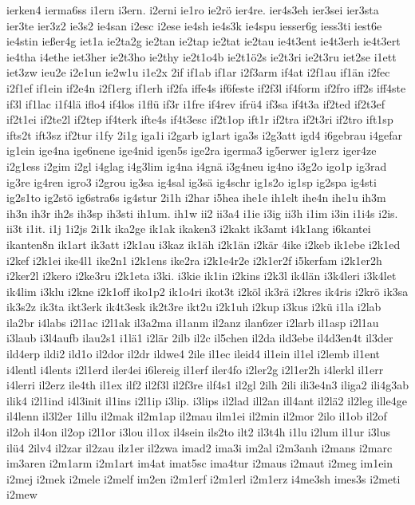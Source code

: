 {ierken4
ierma6ss
i1ern
i3ern.
i2erni
ie1ro
ie2rö
ier4re.
ier4s3eh
ier3sei
ier3sta
ier3te
ier3z2
ie3s2
ie4san
i2esc
i2ese
ie4sh
ie4s3k
ie4spu
iesser6g
iess3ti
iest6e
ie4stin
ießer4g
iet1a
ie2ta2g
ie2tan
ie2tap
ie2tat
ie2tau
ie4t3ent
ie4t3erh
ie4t3ert
ie4tha
i4ethe
iet3her
ie2t3ho
ie2thy
ie2t1o4b
ie2t1ö2s
ie2t3ri
ie2t3ru
iet2se
i1ett
iet3zw
ieu2e
i2e1un
ie2w1u
i1e2x
2if
if1ab
if1ar
i2f3arm
if4at
i2f1au
if1än
i2fec
i2f1ef
if1ein
if2e4n
i2f1erg
if1erh
if2fa
iffe4s
if6feste
if2f3l
if4form
if2fro
iff2s
iff4ste
if3l
if1lac
i1f4lä
iflo4
if4los
i1flü
if3r
i1fre
if4rev
ifrü4
if3sa
if4t3a
if2ted
if2t3ef
if2t1ei
if2te2l
if2tep
if4terk
ifte4s
if4t3esc
if2t1op
ift1r
if2tra
if2t3ri
if2tro
ift1sp
ifts2t
ift3sz
if2tur
i1fy
2i1g
iga1i
i2garb
ig1art
iga3s
i2g3att
igd4
i6gebrau
i4gefar
ig1ein
ige4na
ige6nene
ige4nid
igen5s
ige2ra
igerma3
ig5erwer
ig1erz
iger4ze
i2g1ess
i2gim
i2gl
i4glag
i4g3lim
ig4na
i4gnä
i3g4neu
ig4no
i3g2o
igo1p
ig3rad
ig3re
ig4ren
igro3
i2grou
ig3sa
ig4sal
ig3sä
ig4schr
ig1s2o
ig1sp
ig2spa
ig4sti
ig2s1to
ig2stö
ig6stra6s
ig4stur
2i1h
i2har
i5hea
ihe1e
ih1elt
ihe4n
ihe1u
ih3m
ih3n
ih3r
ih2s
ih3sp
ih3sti
ih1um.
ih1w
ii2
ii3a4
i1ie
i3ig
ii3h
i1im
i3in
i1i4s
i2is.
ii3t
i1it.
i1j
1i2js
2i1k
ika2ge
ik1ak
ikaken3
i2kakt
ik3amt
i4k1ang
i6kantei
ikanten8n
ik1art
ik3att
i2k1au
i3kaz
ik1äh
i2k1än
i2kär
4ike
i2keb
ik1ebe
i2k1ed
i2kef
i2k1ei
ike4l1
ike2n1
i2k1ens
ike2ra
i2k1e4r2e
i2k1er2f
i5kerfam
i2k1er2h
i2ker2l
i2kero
i2ke3ru
i2k1eta
i3ki.
i3kie
ik1in
i2kins
i2k3l
ik4län
i3k4leri
i3k4let
ik4lim
i3klu
i2kne
i2k1off
iko1p2
ik1o4ri
ikot3t
i2köl
ik3rä
i2kres
ik4ris
i2krö
ik3sa
ik3s2z
ik3ta
ikt3erk
ik4t3esk
ik2t3re
ikt2u
i2k1uh
i2kup
i3kus
i2kü
i1la
i2lab
ila2br
i4labs
i2l1ac
i2l1ak
il3a2ma
il1anm
il2anz
ilan6zer
i2larb
il1asp
i2l1au
i3laub
i3l4aufb
ilau2s1
i1lä1
i2lär
2ilb
il2c
il5chen
il2da
ild3ebe
il4d3en4t
il3der
ild4erp
ildi2
ild1o
il2dor
il2dr
ildwe4
2ile
il1ec
ileid4
il1ein
il1el
i2lemb
il1ent
i4lentl
i4lents
i2l1erd
iler4ei
i6lereig
il1erf
iler4fo
i2ler2g
i2l1er2h
i4lerkl
il1err
i4lerri
il2erz
ile4th
il1ex
ilf2
il2f3l
il2f3re
ilf4s1
il2gl
2ilh
2ili
ili3e4n3
iliga2
ili4g3ab
ilik4
i2l1ind
i4l3init
il1ins
i2l1ip
i3lip.
i3lips
il2lad
ill2an
ill4ant
il2lä2
il2leg
ille4ge
il4lenn
il3l2er
1illu
il2mak
il2m1ap
il2mau
ilm1ei
il2min
il2mor
2ilo
il1ob
il2of
il2oh
il4on
il2op
i2l1or
i3lou
il1ox
il4sein
ils2to
ilt2
il3t4h
i1lu
i2lum
il1ur
i3lus
ilü4
2ilv4
il2zar
il2zau
ilz1er
il2zwa
imad2
ima3i
im2al
i2m3anh
i2mans
i2marc
im3aren
i2m1arm
i2m1art
im4at
imat5sc
ima4tur
i2maus
i2maut
i2meg
im1ein
i2mej
i2mek
i2mele
i2melf
im2en
i2m1erf
i2m1erl
i2m1erz
i4me3sh
imes3s
i2meti
i2mew
}
